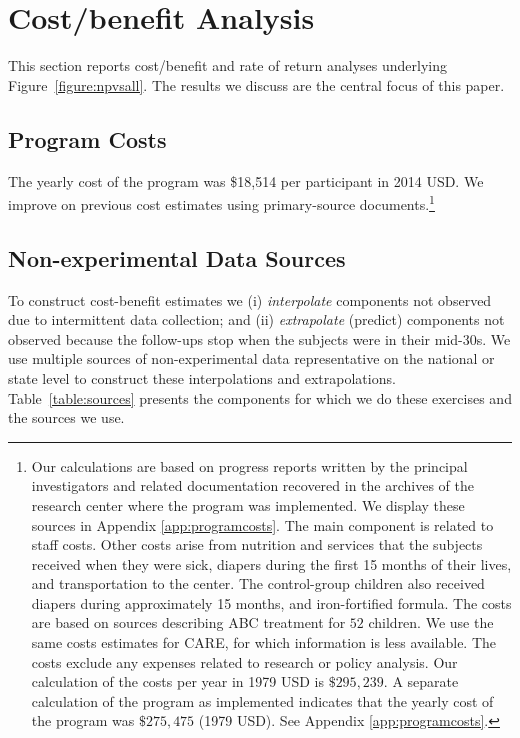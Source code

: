 \section{Cost/benefit Analysis} \label{section:cbaresults}

This section reports cost/benefit and rate of return analyses underlying Figure~\ref{figure:npvsall}. The results we discuss are the central focus of this paper.

\subsection{Program Costs} \label{section:programscosts}

The yearly cost of the program was \$18,514 per participant in 2014 USD. We improve on previous cost estimates using primary-source documents.\footnote{Our calculations are based on progress reports written by the principal investigators and related documentation recovered in the archives of the research center where the program was implemented. We display these sources in Appendix \ref{app:programcosts}. The main component is related to staff costs. Other costs arise from nutrition and services that the subjects received when they were sick, diapers during the first 15 months of their lives, and transportation to the center. The control-group children also received diapers during approximately 15 months, and iron-fortified formula. The costs are based on sources describing ABC treatment for $52$ children. We use the same costs estimates for CARE, for which information is less available. The costs exclude any expenses related to research or policy analysis. Our calculation of the costs per year in 1979 USD is $\$295,239$. A separate calculation of the program as implemented indicates that the yearly cost of the program was $\$275,475$ (1979 USD). See Appendix \ref{app:programcosts}.}

\subsection{Non-experimental Data Sources}

To construct cost-benefit estimates we (i) \textit{interpolate} components not observed due to intermittent data collection; and (ii) \textit{extrapolate} (predict) components not observed because the follow-ups stop when the subjects were in their mid-30s. We use multiple sources of non-experimental data representative on the national or state level to construct these interpolations and extrapolations. Table~\ref{table:sources} presents the components for which we do these exercises and the sources we use.

